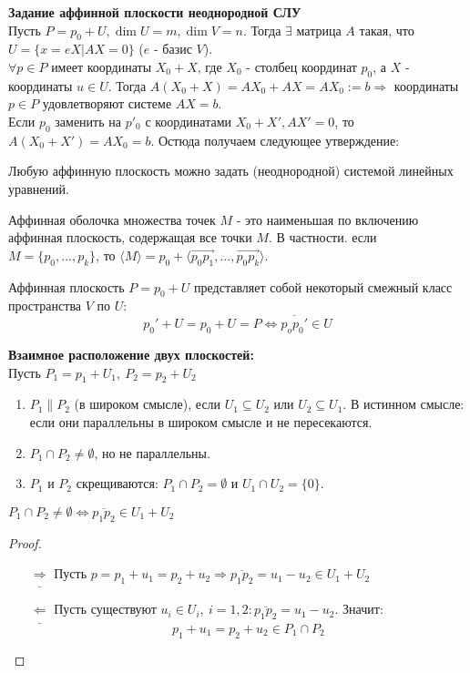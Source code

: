 \textbf{Задание аффинной плоскости неоднородной СЛУ}\\
Пусть $P = p_0 + U, \dim U = m, \dim V = n$. Тогда $\exists$ матрица $A$ такая, что $U = \{x = eX | AX = 0\}$ ($e$ - базис $V$).\\
$\forall p \in P$ имеет координаты $X_0 + X$, где $X_0$ - столбец координат $p_0$, а $X$ - координаты $u \in U$.
Тогда $A(X_0 + X) = AX_0 + AX = AX_0 := b \Longrightarrow$ координаты $p \in P$ удовлетворяют системе $AX = b$.\\
Если $p_0$ заменить на $p'_0$ с координатами $X_0 + X', AX' = 0$, то $A(X_0 + X') = AX_0 = b$. Остюда получаем следующее утверждение:
\begin{subtheorem}
    Любую аффинную плоскость можно задать (неоднородной) системой линейных уравнений.
\end{subtheorem}
\begin{definition}
    Аффинная оболочка множества точек $M$ - это наименьшая по включению аффинная плоскость, содержащая все точки $M$. В частности. если $M = \{p_0,...,p_k\}$, то $\langle M \rangle = p_0 + \langle \overrightarrow{p_0p_1},...,\overrightarrow{p_0p_k} \rangle$.
\end{definition}


\newpage

\begin{remark}
    Аффинная плоскость $P=p_0+U$ представляет собой некоторый смежный класс пространства $V$ по $U$:
    \[p_0'+U=p_0+U=P \Longleftrightarrow  \overline{p_op_0'}\in U\]
\end{remark}
\textbf{Взаимное расположение двух плоскостей:}\\ 
Пусть $P_1=p_1+U_1,\ P_2=p_2+U_2$
\begin{enumerate}
    \item $P_1 \parallel P_2$ (в широком смысле), если $U_1\subseteq U_2$ или $U_2\subseteq U_1$. В истинном смысле: если они параллельны в широком смысле и не пересекаются. 
    \item $P_1 \cap P_2\ne \emptyset$, но не параллельны.
    \item $P_1$ и $P_2$ скрещиваются: $P_1\cap P_2=\emptyset$ и $U_1\cap U_2 =\{0\}$.
\end{enumerate}
\begin{subtheorem}
    $P_1\cap P_2\ne \emptyset \Longleftrightarrow \overline{p_1p_2}\in U_1+U_2$
\end{subtheorem} 
\begin{proof} \tab
    \begin{itemize}
        \item[$\underline{\Longrightarrow}$] Пусть $p=p_1+u_1=p_2+u_2 \Rightarrow \overline{p_1p_2}=u_1-u_2\in U_1+U_2$
        \item[$\underline{\Longleftarrow}$] Пусть существуют $u_i\in U_i,\ i=1,2: \overline{p_1p_2}=u_1-u_2$. 
        Значит:
        \[p_1+u_1=p_2+u_2\in P_1\cap P_2\]
    \end{itemize}
\end{proof}

